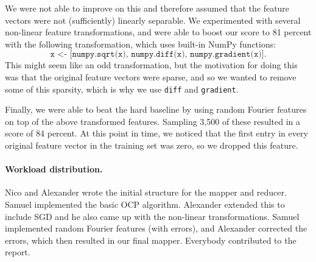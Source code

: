 \documentclass[a4paper, 11pt]{article}
\begin{document}
We were not able to improve on this and therefore assumed that the feature vectors were not (sufficiently)
linearly separable. We experimented with several non-linear feature transformations, and were able to boost our score to 81 percent with the following transformation, which uses built-in NumPy functions:
\begin{equation*}
\texttt{x <- [numpy.sqrt(x), numpy.diff(x), numpy.gradient(x)]}.
\end{equation*}
This might seem like an odd transformation, but the motivation for doing this was that the original feature vectors were sparse, and so we wanted to remove some of this sparsity, which is why we use \texttt{diff} and \texttt{gradient}.

Finally, we were able to beat the hard baseline by using random Fourier features on top of the above transformed features. Sampling 3,500 of these resulted in a score of 84 percent. At this point in time, we noticed that the first entry in every original feature vector in the training set was zero, so we dropped this feature.

\paragraph{Workload distribution.\!\!\!}
Nico and Alexander wrote the initial structure for the mapper and reducer. Samuel implemented the basic OCP algorithm. Alexander extended this to include SGD and he also came up with the non-linear transformations. Samuel implemented random Fourier features (with errors), and Alexander corrected the errors, which then resulted in our final mapper. Everybody contributed to the report.
\end{document}
